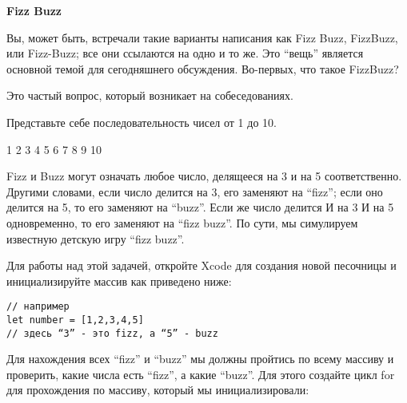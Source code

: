 \vspace{\baselineskip}

\textbf{Fizz Buzz}

\vspace{\baselineskip}

Вы, может быть, встречали такие варианты написания как Fizz Buzz, FizzBuzz, или Fizz-Buzz; все они ссылаются на одно и то же. Это “вещь” является основной темой для сегодняшнего обсуждения. Во-первых, что такое FizzBuzz?

\vspace{\baselineskip}

Это частый вопрос, который возникает на собеседованиях.

\vspace{\baselineskip}

Представьте себе последовательность чисел от 1 до 10.

\vspace{\baselineskip}

\begin{tcolorbox} 
1 2 3 4 5 6 7 8 9 10
\end{tcolorbox}

\vspace{\baselineskip}

Fizz и Buzz могут означать любое число, делящееся на 3 и на 5 соответственно. Другими словами, если число делится на 3, его заменяют на “fizz”; если оно делится на 5, то его заменяют на “buzz”. Если же число делится И на 3 И на 5 одновременно, то его заменяют на “fizz buzz”. По сути, мы симулируем известную детскую игру “fizz buzz”.

\vspace{\baselineskip}

Для работы над этой задачей, откройте Xcode для создания новой песочницы и инициализируйте массив как приведено ниже:

\vspace{\baselineskip}

\begin{tcolorbox} 
\begin{verbatim}
// например
let number = [1,2,3,4,5]
// здесь “3” - это fizz, а “5” - buzz
\end{verbatim}
\end{tcolorbox}

\vspace{\baselineskip}

Для нахождения всех “fizz” и “buzz” мы должны пройтись по всему массиву и проверить, какие числа есть “fizz”, а какие “buzz”. Для этого создайте цикл for для прохождения по массиву, который мы инициализировали:

